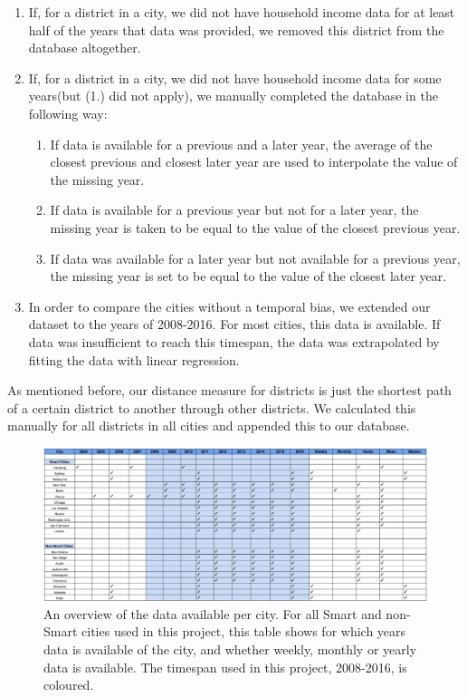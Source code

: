 \documentclass[a4paper, 10pt]{IEEEconf}      %
\begin{document}
\begin{enumerate}
\item If, for a district in a city, we did not have household income data for at least half of the years that data was provided, we removed this district from the database altogether. 
\item If, for a district in a city, we did not have household income data for some years(but (1.) did not apply), we manually completed the database in the following way: 
	\begin{enumerate}
	\item If data is available for a previous and a later year, the average of the closest previous and closest later year are used to interpolate the value of the missing year. 
	\item If data is available for a previous year but not for a later year, the missing year is taken to be equal to the value of the closest previous year. 
	\item If data was available for a later year but not available for a previous year, the missing year is set to be equal to the value of the closest later year.
	\end{enumerate}
\item In order to compare the cities without a temporal bias, we extended our dataset to the years of 2008-2016. For most cities, this data is available. If data was insufficient to reach this timespan, the data was extrapolated by fitting the data with linear regression.
\end{enumerate}

As mentioned before, our distance measure for districts is just the shortest path of a certain district to another through other 
districts. We calculated this manually for all districts in all cities and appended this to our database.


\begin{figure}[h]
		\includegraphics[scale=0.6]{data_overview.png}
		\caption{An overview of the data available per city. For all Smart and non-Smart cities used in this project, this table shows for which years data is available of the city, and whether weekly, monthly or yearly data is available. The timespan used in this project, 2008-2016, is coloured.}
		\label{fig:data}
\end{figure}
\end{document}

